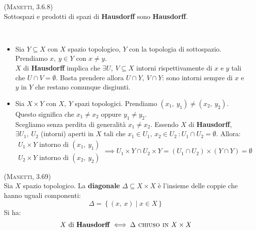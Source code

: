 \begin{proposition}\label{prodottihause}\textsc{(Manetti, 3.6.8)}\\
Sottospazi e prodotti di spazi di \textbf{Hausdorff} sono \textbf{Hausdorff}.
\end{proposition}
\begin{demonstration}~{}
\begin{itemize}
\item Sia $Y\subseteq X$ con $X$ spazio topologico, $Y$ con la topologia di sottospazio. Prendiamo $x,\ y\in Y$ con $x\neq y$.\\
$X$ di \textbf{Hausdorff} implica che $\exists U,\ V\subseteq X$ intorni rispettivamente di $x$ e $y$ tali che $U\cap V=\emptyset$. Basta prendere allora $U\cap Y,\ V\cap Y$: sono intorni sempre di $x$ e $y$ in $Y$ che restano comunque disgiunti.
\item Sia $X\times Y$ con $X,\ Y$ spazi topologici. Prendiamo $\left(x_1,\ y_1\right)\neq\left(x_2,\ y_2\right)$. Questo significa che $x_1\neq x_2$ oppure $y_1\neq y_2$.\\ Scegliamo senza perdita di generalità $x_1\neq x_2$. Essendo $X$ di \textbf{Hausdorff}, $\exists U_1,\ U_2$ (intorni) aperti in $X$  tali che $x_1\in U_1,\ x_2\in U_2\ \colon U_1\cap U_2=\emptyset$. Allora:
\begin{equation*}
\begin{array}{l}
	U_1\times Y\text{ intorno di }\left(x_1,\ y_1\right)\\
	U_2\times Y\text{ intorno di }\left(x_2,\ y_2\right)
\end{array}
\implies U_1\times Y\cap U_2\times Y=\left(U_1\cap U_2\right)\times\left(Y\cap Y\right)=\emptyset 
\end{equation*}
\end{itemize}
\vspace{-6mm}
\end{demonstration}
\begin{theorema}\textsc{(Manetti, 3.69)} \label{hausdorff diagonale chiusa}\\
Sia $X$ spazio topologico. La \textbf{diagonale} $\Delta\subseteq X\times X$ è l'insieme delle coppie che hanno uguali componenti:
\begin{equation}
	\Delta=\left\{\left(x,\ x\right)\mid x\in X\right\}
\end{equation}
Si ha:
\begin{equation}
X \text{ di \textbf{Hausdorff}} \iff \Delta \textsc{ chiuso in }X\times X
\end{equation}
\vspace{-6mm}
\end{theorema}
